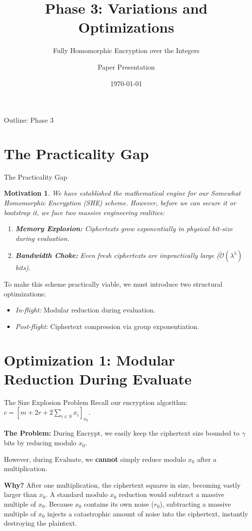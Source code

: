 \documentclass[10pt, aspectratio=169]{beamer}
\title[Phase 3: Optimizations]{Phase 3: Variations and Optimizations}
\subtitle{Fully Homomorphic Encryption over the Integers}
\author{Paper Presentation}
\date{\today}
\newtheorem{motivation}{Motivation}
\begin{document}
\frame{\titlepage}

\begin{frame}{Outline: Phase 3}
    \tableofcontents
\end{frame}

\section{The Practicality Gap}
\begin{frame}{The Practicality Gap}
    \begin{motivation}
    We have established the mathematical engine for our Somewhat Homomorphic Encryption (SHE) scheme. However, before we can secure it or bootstrap it, we face two massive engineering realities:
    \begin{enumerate}
        \item \textbf{Memory Explosion:} Ciphertexts grow exponentially in physical bit-size during evaluation.
        \item \textbf{Bandwidth Choke:} Even fresh ciphertexts are impractically large ($\tilde{\mathcal{O}}(\lambda^5)$ bits).
    \end{enumerate}
    \end{motivation}
    \pause
    
    \vspace{0.3cm}
    To make this scheme practically viable, we must introduce two structural optimizations:
    \begin{itemize}
        \item \textit{In-flight:} Modular reduction during evaluation.
        \item \textit{Post-flight:} Ciphertext compression via group exponentiation.
    \end{itemize}
\end{frame}

\section{Optimization 1: Modular Reduction During Evaluate}
\begin{frame}{The Size Explosion Problem}
    Recall our encryption algorithm: $c = \left[ m + 2r + 2\sum_{i \in S} x_i \right]_{x_0}$.
    \pause
    
    \vspace{0.3cm}
    \textbf{The Problem:}
    During $\text{Encrypt}$, we easily keep the ciphertext size bounded to $\gamma$ bits by reducing modulo $x_0$. 
    
    However, during $\text{Evaluate}$, we \textbf{cannot} simply reduce modulo $x_0$ after a multiplication. 
    \pause
    
    \vspace{0.3cm}
    \textbf{Why?} 
    After one multiplication, the ciphertext squares in size, becoming vastly larger than $x_0$. A standard modulo $x_0$ reduction would subtract a massive multiple of $x_0$. Because $x_0$ contains its own noise ($r_0$), subtracting a massive multiple of $x_0$ injects a catastrophic amount of noise into the ciphertext, instantly destroying the plaintext.
\end{frame}
\end{document}
